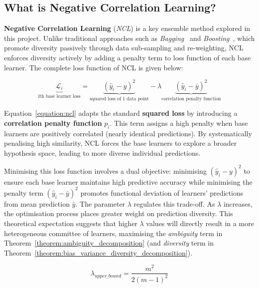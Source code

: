 \subsection{What is Negative Correlation Learning? }
\label{subsec:background_ncl}
\textbf{Negative Correlation Learning} (\textit{NCL}) is a key ensemble method explored in this project. Unlike traditional approaches such as \textit{Bagging}~\cite{breiman1996bagging} and \textit{Boosting}~\cite{freund1997decision}, which promote diversity passively through data sub-sampling and re-weighting, NCL enforces diversity actively by adding a penalty term to loss function of each base learner. The complete loss function of NCL is given below: 

\begin{equation}
    \label{equation:ncl}
    \underbrace{\mathcal{L}_i}_{\text{ith base learner loss}} = \underbrace{(\hat{y}_i - y)^2}_{\text{squared loss of 1 data point}} - \lambda \underbrace{(\hat{y}_i - \bar{y})^2}_{\text{correlation penalty function}}
\end{equation}

Equation~\ref{equation:ncl} adapts the standard \textbf{squared loss} by introducing a \textbf{correlation penalty function} $p_i$. This term assigns a high penalty when base learners are positively correlated (nearly identical predictions). By systematically penalising high similarity, NCL forces the base learners to explore a broader hypothesis space, leading to more diverse individual predictions. 

Minimising this loss function involves a dual objective: minimising $(\hat{y}_i - y)^2$ to ensure each base learner maintains high predictive accuracy while minimising the penalty term $(\hat{y}_i - \bar{y})^2$ promotes functional deviation of learners' predictions from mean prediction $\bar{y}$. The parameter $\lambda$ regulates this trade-off. As $\lambda$ increases, the optimisation process places greater weight on prediction diversity. This theoretical expectation suggests that higher $\lambda$ values will directly result in a more heterogeneous committee of learners, maximising the \textit{ambiguity} term in Theorem~\ref{theorem:ambiguity_decomposition} (and \textit{diversity} term in Theorem~\ref{theorem:bias_variance_diversity_decomposition}). 

\begin{equation}
    \label{equation:lambda_upper_bound}
    \lambda_{upper\_bound} = \frac{m^2}{2(m - 1)^2}
\end{equation}

